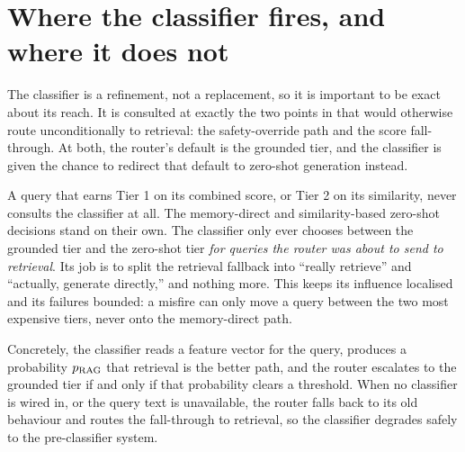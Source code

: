 \section{Where the classifier fires, and where it does not}
\label{sec:ruc-where}

The classifier is a refinement, not a replacement, so it is important to be exact
about its reach. It is consulted at exactly the two points in  that
would otherwise route unconditionally to retrieval: the safety-override path and the
score fall-through. At both, the router's default is the grounded tier, and the
classifier is given the chance to redirect that default to zero-shot generation
instead.

\begin{pitfall}
A query that earns Tier 1 on its combined score, or Tier 2 on its similarity, never
consults the classifier at all. The memory-direct and similarity-based zero-shot
decisions stand on their own. The classifier only ever chooses between the grounded
tier and the zero-shot tier \emph{for queries the router was about to send to
retrieval}. Its job is to split the retrieval fallback into ``really retrieve'' and
``actually, generate directly,'' and nothing more. This keeps its influence
localised and its failures bounded: a misfire can only move a query between the two
most expensive tiers, never onto the memory-direct path.
\end{pitfall}

Concretely, the classifier reads a feature vector for the query, produces a
probability $p_{\text{RAG}}$ that retrieval is the better path, and the router escalates to the
grounded tier if and only if that probability clears a threshold. When no classifier
is wired in, or the query text is unavailable, the router falls back to its old
behaviour and routes the fall-through to retrieval, so the classifier degrades safely
to the pre-classifier system.

